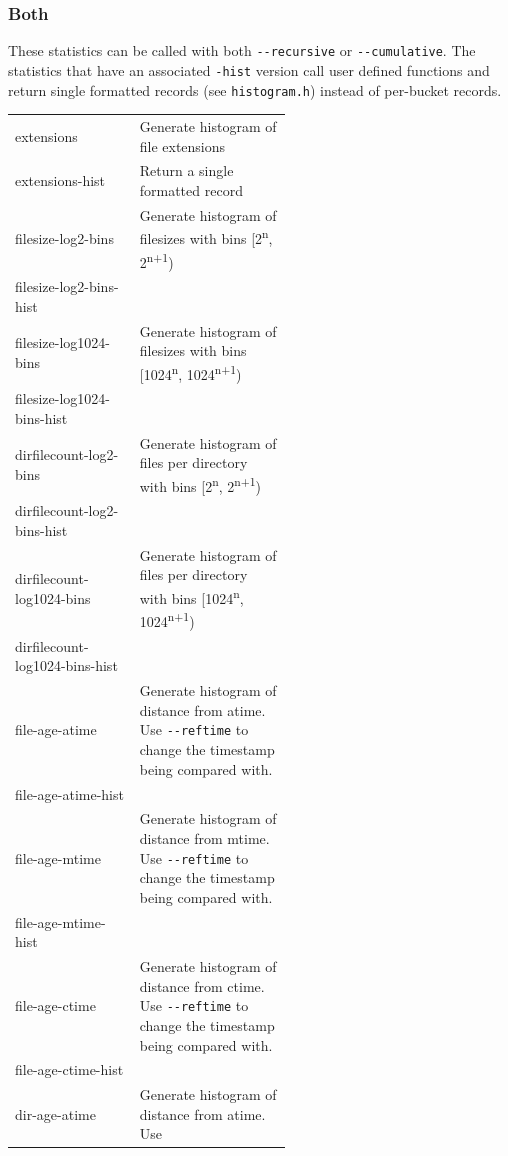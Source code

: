 \subsubsection{Both}
These statistics can be called with both \texttt{-{}-recursive} or
\texttt{-{}-cumulative}. The statistics that have an associated
\texttt{-hist} version call user defined functions and return single
formatted records (see \texttt{histogram.h}) instead of per-bucket
records.
\\
\begin{longtable}{|l|p{0.55\linewidth}|}
  \hline
  extensions & Generate histogram of file extensions \\
  extensions-hist & Return a single formatted record \\
  \hline
  filesize-log2-bins & Generate histogram of filesizes with bins
  [2\textsuperscript{n}, 2\textsuperscript{n+1}) \\
  filesize-log2-bins-hist & \\
  \hline
  filesize-log1024-bins & Generate histogram of filesizes with bins
  [1024\textsuperscript{n}, 1024\textsuperscript{n+1}) \\
  filesize-log1024-bins-hist & \\
  \hline
  dirfilecount-log2-bins & Generate histogram of files per directory with bins
  [2\textsuperscript{n}, 2\textsuperscript{n+1}) \\
  dirfilecount-log2-bins-hist & \\
  \hline
  dirfilecount-log1024-bins & Generate histogram of files per directory with bins
  [1024\textsuperscript{n}, 1024\textsuperscript{n+1}) \\
  dirfilecount-log1024-bins-hist & \\
  \hline
  file-age-atime & Generate histogram of distance from atime. Use
  \texttt{-{}-reftime} to change the timestamp being compared with. \\
  file-age-atime-hist & \\
  \hline
  file-age-mtime & Generate histogram of distance from mtime. Use
  \texttt{-{}-reftime} to change the timestamp being compared with. \\
  file-age-mtime-hist & \\
  \hline
  file-age-ctime & Generate histogram of distance from ctime. Use
  \texttt{-{}-reftime} to change the timestamp being compared with. \\
  file-age-ctime-hist & \\
  \hline
  dir-age-atime & Generate histogram of distance from atime. Use

\end{longtable}
